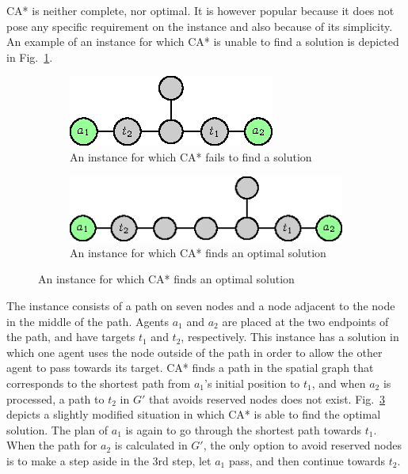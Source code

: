 CA* is neither complete, nor optimal. It is however popular because it does not pose any specific requirement on the instance and also because of its simplicity.
An example of an instance for which CA* is unable to find a solution is depicted in Fig.~\ref{fig:castarfail}.
\begin{figure}
    \centering
    \begin{subfigure}[b]{0.48\textwidth}
        \includegraphics{figurer/castarfail.eps}
        \caption{An instance for which CA* fails to find a solution}
        \label{fig:castarfail}
    \end{subfigure}\hspace{5mm}
    \begin{subfigure}[b]{0.48\textwidth}
        \includegraphics{figurer/castarnofail.eps}
        \caption{An instance for which CA* finds an optimal solution}
        \label{fig:castarnofail}
    \end{subfigure}
\end{figure}
The instance consists of a path on seven nodes and a node adjacent to the node in the middle of the path.
Agents $a_1$ and $a_2$ are placed at the two endpoints of the path, and have targets $t_1$ and $t_2$, respectively.
This instance has a solution in which one agent uses the node outside of the path in order to allow the other agent to pass towards its target.
CA* finds a path in the spatial graph that corresponds to the shortest path from $a_1$'s initial position to $t_1$, and when $a_2$ is processed,
a path to $t_2$ in $G'$ that avoids reserved nodes does not exist.
Fig.~\ref{fig:castarnofail} depicts a slightly modified situation in which CA* is able to find the optimal solution.
The plan of $a_1$ is again to go through the shortest path towards $t_1$.
When the path for $a_2$ is calculated in $G'$, the only option to avoid reserved nodes is to make a step aside in the 3rd step, let $a_1$ pass, and then continue towards $t_2$.

